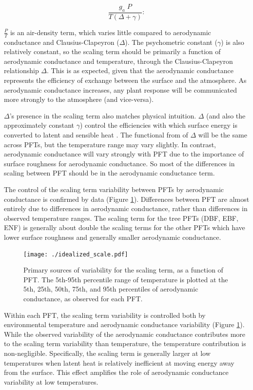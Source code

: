 \documentclass[draft,linenumbers]{agujournal}
\begin{document}
\begin{equation} \frac{g_a \; P}{T(\Delta + \gamma)}:
\end{equation}

$\frac{P}{T}$ is an air-density term, which varies little compared to
aerodynamic conductance and Clausius-Clapeyron ($\Delta$). The
psychometric constant ($\gamma$) is also relatively constant, so the
scaling term should be primarily a function of aerodynamic conductance
and temperature, through the Clausius-Clapeyron relationship
$\Delta$. This is as expected, given that the aerodynamic conductance
represents the efficiency of exchange between the surface and the
atmosphere. As aerodynamic conductance increases, any plant response
will be communicated more strongly to the atmosphere (and vice-versa).

$\Delta$'s presence in the scaling term also matches physical
intuition. $\Delta$ (and also the approximately constant $\gamma$)
control the efficiencies with which surface energy is converted to
latent and sensible heat \citep{Monteith_1965}. The functional from of
$\Delta$ will be the same across PFTs, but the temperature range may
vary slightly. In contrast, aerodynamic conductance will vary strongly
with PFT due to the importance of surface roughness for aerodynamic
conductance. So most of the differences in scaling between PFT should
be in the aerodynamic conductance term.

The control of the scaling term variability between PFTs by
aerodynamic conductance is confirmed by data (Figure
\ref{scale_vary}). Differences between PFT are almost entirely due to
differences in aerodynamic conductance, rather than differences in
observed temperature ranges. The scaling term for the tree PFTs (DBF,
EBF, ENF) is generally about double the scaling terms for the other
PFTs which have lower surface roughness and generally smaller
aerodynamic conductance.

\begin{figure} \centering
\texttt{[image: ./idealized\_scale.pdf]}
\caption{Primary sources of variability for the scaling term, as a
function of PFT. The 5th-95th percentile range of temperature is
plotted at the 5th, 25th, 50th, 75th, and 95th percentiles of
aerodynamic conductance, as observed for each PFT.}
\label{scale_vary}
\end{figure}

Within each PFT, the scaling term variability is controlled both by
environmental temperature and aerodynamic conductance variability
(Figure \ref{scale_vary}). While the observed variability of the
aerodynamic conductance contributes more to the scaling term
variability than temperature, the temperature contribution is
non-negligible. Specifically, the scaling term is generally larger at
low temperatures when latent heat is relatively inefficient at moving
energy away from the surface. This effect amplifies the role of
aerodynamic conductance variability at low temperatures.
\end{document}
